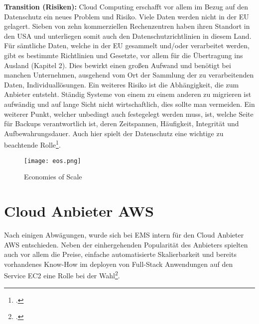 \textbf{Transition (Risiken):} Cloud Computing erschafft vor allem im Bezug auf den Datenschutz ein neues Problem und Risiko. Viele Daten werden nicht in der EU gelagert.
Sieben von zehn kommerziellen Rechenzentren haben ihren Standort in den USA und unterliegen somit auch den Datenschutzrichtlinien in diesem Land.
Für sämtliche Daten, welche in der EU gesammelt und/oder verarbeitet werden, gibt es bestimmte Richtlinien und Gesetzte, vor allem für die Übertragung ins Ausland (Kapitel 2).
Dies bewirkt einen großen Aufwand und benötigt bei manchen Unternehmen, ausgehend vom Ort der Sammlung der zu verarbeitenden Daten,
Individuallösungen. Ein weiteres Risiko ist die Abhängigkeit, die zum Anbieter entsteht.
Ständig Systeme von einem zu einem anderen zu migrieren ist aufwändig und auf lange Sicht nicht wirtschaftlich, dies sollte man vermeiden.
Ein weiterer Punkt, welcher unbedingt auch festegelegt werden muss, ist, welche Seite
für Backups verantwortlich ist, deren Zeitspannen, Häufigkeit, Integrität und Aufbewahrungsdauer. Auch hier spielt der Datenschutz eine wichtige zu beachtende Rolle\footcite{Lehrunterlagen-HTL-cloud}.
\begin{center}
\begin{figure}[H]
    \centering
    \texttt{[image: eos.png]}
    \caption{Economies of Scale}
\end{figure}
\end{center}
\break

\section{Cloud Anbieter AWS}
Nach einigen Abwägungen, wurde sich bei EMS intern für den Cloud Anbieter AWS entschieden.
Neben der einhergehenden Popularität des Anbieters spielten auch vor allem die Preise, einfache automatisierte Skalierbarkeit und bereits vorhandenes Know-How im deployen von Full-Stack Anwendungen auf den Service EC2 eine Rolle bei der Wahl\footcite{deploy-nodejs1}.
